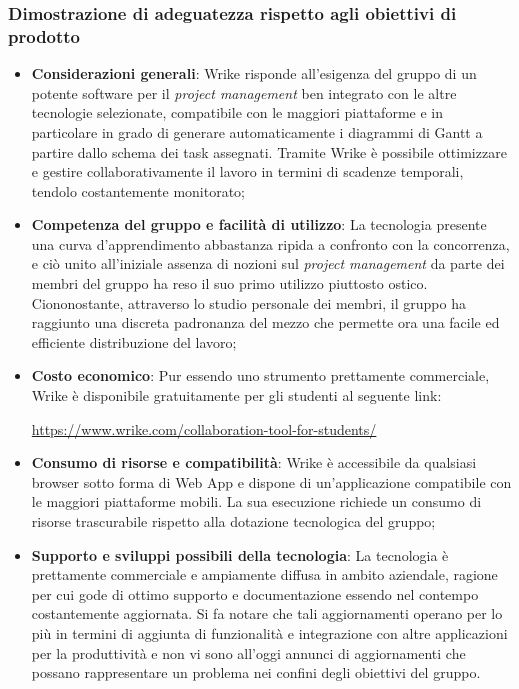 \documentclass[./../Technology Baseline.tex]{subfiles}
\begin{document}
\subsubsection{Dimostrazione di adeguatezza rispetto agli obiettivi di prodotto}
\begin{itemize}
	\item \textbf{Considerazioni generali}: Wrike risponde all'esigenza del gruppo di un potente software per il \textit{project management} ben integrato con le altre tecnologie selezionate, compatibile con le maggiori piattaforme e in particolare in grado di generare automaticamente i diagrammi di Gantt a partire dallo schema dei task assegnati. Tramite Wrike è possibile ottimizzare e gestire collaborativamente il lavoro in termini di scadenze temporali, tendolo costantemente monitorato;
	\item \textbf{Competenza del gruppo e facilità di utilizzo}: La tecnologia presente una curva d'apprendimento abbastanza ripida a confronto con la concorrenza, e ciò unito all'iniziale assenza di nozioni sul \textit{project management} da parte dei membri del gruppo ha reso il suo primo utilizzo piuttosto ostico. Ciononostante, attraverso lo studio personale dei membri, il gruppo ha raggiunto una discreta padronanza del mezzo che permette ora una facile ed efficiente distribuzione del lavoro;
	\item \textbf{Costo economico}: Pur essendo uno strumento prettamente commerciale, Wrike è disponibile gratuitamente per gli studenti al seguente link:
	\begin{center}
		\url{https://www.wrike.com/collaboration-tool-for-students/}
	\end{center}
	\item \textbf{Consumo di risorse e compatibilità}: Wrike è accessibile da qualsiasi browser sotto forma di Web App e dispone di un'applicazione compatibile con le maggiori piattaforme mobili. La sua esecuzione richiede un consumo di risorse trascurabile rispetto alla dotazione tecnologica del gruppo;
	\item \textbf{Supporto e sviluppi possibili della tecnologia}: La tecnologia è prettamente commerciale e ampiamente diffusa in ambito aziendale, ragione per cui gode di ottimo supporto e documentazione essendo nel contempo costantemente aggiornata. Si fa notare che tali aggiornamenti operano per lo più in termini di aggiunta di funzionalità e integrazione con altre applicazioni per la produttività e non vi sono all'oggi annunci di aggiornamenti che possano rappresentare un problema nei confini degli obiettivi del gruppo.
\end{itemize}
\end{document}
